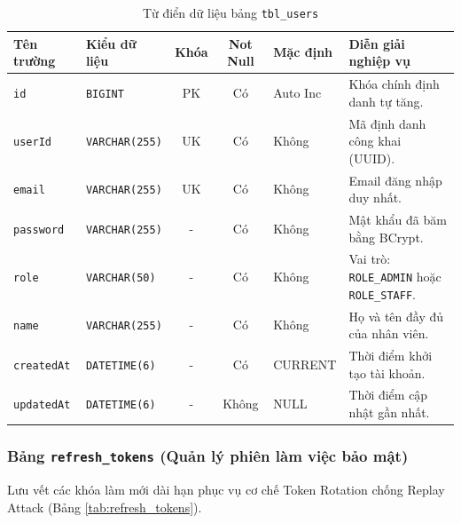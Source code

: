 \begin{table}[htbp]
\centering
\caption{Từ điển dữ liệu bảng \texttt{tbl\_users}}
\label{tab:tbl_users}
\vspace{2mm}
\begin{tabularx}{\textwidth}{|p{2.5cm}|p{2.8cm}|c|c|p{1.8cm}|X|}
\hline
\textbf{Tên trường} & \textbf{Kiểu dữ liệu} & \textbf{Khóa} & \textbf{Not Null} & \textbf{Mặc định} & \textbf{Diễn giải nghiệp vụ} \\ \hline
\texttt{id} & \texttt{BIGINT} & PK & Có & Auto Inc & Khóa chính định danh tự tăng. \\ \hline
\texttt{userId} & \texttt{VARCHAR(255)} & UK & Có & Không & Mã định danh công khai (UUID). \\ \hline
\texttt{email} & \texttt{VARCHAR(255)} & UK & Có & Không & Email đăng nhập duy nhất. \\ \hline
\texttt{password} & \texttt{VARCHAR(255)} & - & Có & Không & Mật khẩu đã băm bằng BCrypt. \\ \hline
\texttt{role} & \texttt{VARCHAR(50)} & - & Có & Không & Vai trò: \texttt{ROLE\_ADMIN} hoặc \texttt{ROLE\_STAFF}. \\ \hline
\texttt{name} & \texttt{VARCHAR(255)} & - & Có & Không & Họ và tên đầy đủ của nhân viên. \\ \hline
\texttt{createdAt} & \texttt{DATETIME(6)} & - & Có & CURRENT & Thời điểm khởi tạo tài khoản. \\ \hline
\texttt{updatedAt} & \texttt{DATETIME(6)} & - & Không & NULL & Thời điểm cập nhật gần nhất. \\ \hline
\end{tabularx}
\end{table}

\subsubsection{Bảng \texttt{refresh\_tokens} (Quản lý phiên làm việc bảo mật)}
Lưu vết các khóa làm mới dài hạn phục vụ cơ chế Token Rotation chống Replay Attack (Bảng \ref{tab:refresh_tokens}).

